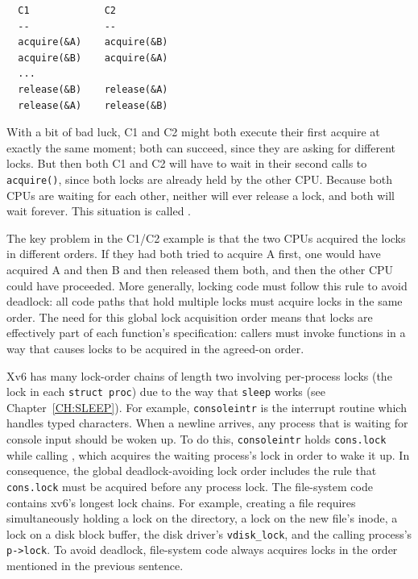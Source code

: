 \begin{verbatim}
  C1             C2
  --             --
  acquire(&A)    acquire(&B)
  acquire(&B)    acquire(&A)
  ...
  release(&B)    release(&A)
  release(&A)    release(&B)
\end{verbatim}

With a bit of bad luck, C1 and C2 might both execute their first
acquire at exactly the same moment; both can succeed, since they are
asking for different locks. But then both C1 and C2 will have to wait
in their second calls to {\tt acquire()}, since both locks are already
held by the other CPU. Because both CPUs are waiting for each
other, neither will ever release a lock, and both will wait forever.
This situation is called .

The key problem in the C1/C2 example is that the two CPUs acquired
the locks in different orders. If they had both tried to acquire A
first, one would have acquired A and then B and then released them both,
and then the other CPU could have proceeded. More generally,
locking code must follow this rule to avoid deadlock: all code paths
that hold multiple locks must acquire locks in the same order. The
need for this global lock acquisition order means that locks are
effectively part of each function's specification: callers must invoke
functions in a way that causes locks to be acquired in the agreed-on
order.

Xv6 has many lock-order chains of length two involving
per-process locks
(the lock in each
\lstinline{struct proc})
due to the way that
\lstinline{sleep}
works (see Chapter~\ref{CH:SLEEP}).
For example,
\lstinline{consoleintr}
is the interrupt routine which handles typed characters.
When a newline arrives, any process that is waiting for
console input should be woken up.
To do this,
\lstinline{consoleintr}
holds
\lstinline{cons.lock}
while calling 
,
which acquires 
the waiting process's lock in order to wake it up.
In consequence, the global deadlock-avoiding
lock order includes the rule that
\lstinline{cons.lock}
must be acquired before any process lock.
The file-system code contains xv6's longest lock chains.
For example, creating a file requires simultaneously
holding a lock on the directory, a lock on the new file's inode,
a lock on a disk block buffer, 
the disk driver's \lstinline{vdisk_lock},
and
the calling process's \lstinline{p->lock}.
To avoid deadlock, file-system code always acquires locks in the order
mentioned in the previous sentence.

